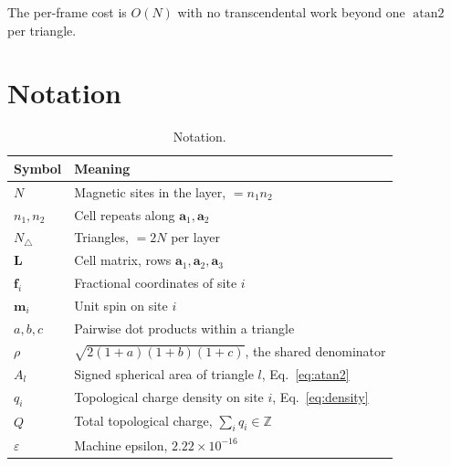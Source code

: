 \documentclass[12pt, a4paper, oneside]{article}
\newcommand{\mvec}{\mathbf{m}}
\newcommand{\avec}{\mathbf{a}}
\newcommand{\Na}{N}
\newcommand{\Ntri}{N_\triangle}
\newcommand{\eps}{\varepsilon}
\begin{document}
The per-frame cost is $O(\Na)$ with no transcendental work beyond one
$\operatorname{atan2}$ per triangle.

\section{Notation}

\begin{table}[h]
    \centering
    \begin{tabular}{ll}
        \toprule
        Symbol & Meaning \\
        \midrule
        $\Na$ & Magnetic sites in the layer, $= n_1 n_2$ \\
        $n_1, n_2$ & Cell repeats along $\avec_1, \avec_2$ \\
        $\Ntri$ & Triangles, $= 2\Na$ per layer \\
        $\mathbf{L}$ & Cell matrix, rows $\avec_1,\avec_2,\avec_3$ \\
        $\mathbf{f}_i$ & Fractional coordinates of site $i$ \\
        $\mvec_i$ & Unit spin on site $i$ \\
        $a,b,c$ & Pairwise dot products within a triangle \\
        $\rho$ & $\sqrt{2(1+a)(1+b)(1+c)}$, the shared denominator \\
        $A_l$ & Signed spherical area of triangle $l$, Eq.~\eqref{eq:atan2} \\
        $q_i$ & Topological charge density on site $i$, Eq.~\eqref{eq:density} \\
        $Q$ & Total topological charge, $\sum_i q_i \in \mathbb{Z}$ \\
        $\eps$ & Machine epsilon, $2.22\times10^{-16}$ \\
        \bottomrule
    \end{tabular}
    \caption{Notation.}
\end{table}
\end{document}
